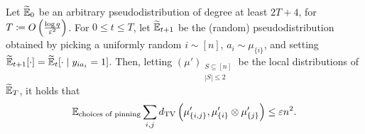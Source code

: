 \documentclass{article}
\begin{document}
\begin{flem}
	Let $\widetilde{\mathbb{E}}_0$ be an arbitrary pseudodistribution of degree at least $2T + 4$, for $T \coloneqq O\left( \frac{\log q}{\varepsilon^2} \right)$. For $0 \le t \le T$, let $\widetilde{\mathbb{E}}_{t+1}$ be the (random) pseudodistribution obtained by picking a uniformly random $i \sim [n]$, $a_i \sim \mu_{\{i\}}$, and setting $\widetilde{\mathbb{E}}_{t+1}[\cdot] = \widetilde{\mathbb{E}}_t[\cdot \mid y_{ia_i} = 1]$. Then, letting $(\mu')_{\substack{S \subseteq [n] \\ |S| \le 2}}$ be the local distributions of $\widetilde{\mathbb{E}}_{T}$, it holds that
	\[ \mathbb{E}_{\text{choices of pinning}} \sum_{i,j} d_{\mathrm{TV}}\left( \mu'_{\{i,j\}} , \mu'_{\{i\}} \otimes \mu'_{\{j\}} \right)  \leq \varepsilon n^2. \]
\end{flem}




\end{document}
